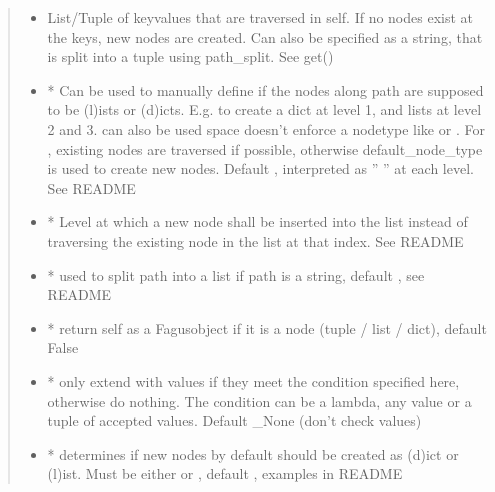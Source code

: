 \documentclass[a4paper,10pt,english]{sphinxmanual}
\begin{document}
\begin{fulllineitems}
\begin{fulllineitems}
\begin{quote}
\begin{description}
\begin{itemize}
\item {}
\sphinxAtStartPar
{} \textendash{} List/Tuple of key\sphinxhyphen{}values that are traversed in self. If no nodes exist at the keys, new nodes are
created. Can also be specified as a string, that is split into a tuple using path\_split. See get()

\item {}
\sphinxAtStartPar
{} \textendash{} * Can be used to manually define if the nodes along path are supposed to be (l)ists or
(d)icts. E.g.  to create a dict at level 1, and lists at level 2 and 3.  can also be
used \textendash{} space doesn’t enforce a node\sphinxhyphen{}type like  or . For , existing nodes are
traversed if possible, otherwise default\_node\_type is used to create new nodes. Default ,
interpreted as ” ” at each level. See README

\item {}
\sphinxAtStartPar
{} \textendash{} * Level at which a new node shall be inserted into the list instead of traversing the
existing node in the list at that index. See README

\item {}
\sphinxAtStartPar
{} \textendash{} * used to split path into a list if path is a string, default , see README

\item {}
\sphinxAtStartPar
{} \textendash{} * return self as a Fagus\sphinxhyphen{}object if it is a node (tuple / list / dict), default False

\item {}
\sphinxAtStartPar
{} \textendash{} * only extend with values if they meet the condition specified here, otherwise do nothing. The
condition can be a lambda, any value or a tuple of accepted values. Default \_None (don’t check values)

\item {}
\sphinxAtStartPar
{} \textendash{} * determines if new nodes by default should be created as (d)ict or (l)ist. Must be
either  or , default , examples in README


\end{itemize}
\end{description}
\end{quote}
\end{fulllineitems}
\end{fulllineitems}
\end{document}

